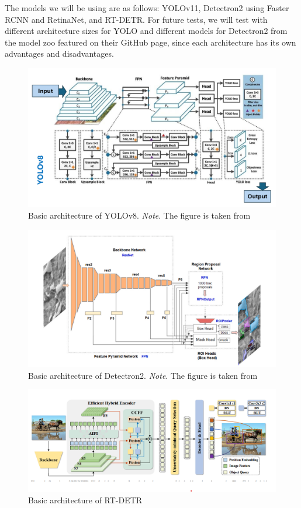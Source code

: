 \documentclass[stu,12pt,floatsintext]{apa7}
\begin{document}
The models we will be using are as follows: YOLOv11, Detectron2 using Faster RCNN and RetinaNet, and RT-DETR. For future tests, we will test with different architecture sizes for YOLO and different models for Detectron2 from the model zoo featured on their GitHub page, since each architecture has its own advantages and disadvantages.

\begin{figure}[!htb]
	\centering
	\includegraphics[width=0.75\linewidth]{images/YOLOv8_architecture.png}
	\caption{Basic architecture of YOLOv8.
		\textit{Note}. The figure is taken from \textcite{sapkota_comparing_2024}}
	\label{fig:YOLOv8-architecture}
\end{figure}

\begin{figure}[!htb]
	\centering
	\includegraphics[width=0.75\linewidth]{images/Detectron2_architecture.png}
	\caption{Basic architecture of Detectron2. \textit{Note}. The figure is taken from \textcite{ackermann_automated_2022}}
	\label{fig:Detectron2-architecture}
\end{figure}

\begin{figure}
    \centering
    \includegraphics[width=0.75\linewidth]{rt-detr_architecture.png}
    \caption{Basic architecture of RT-DETR}
    \label{fig:rt-detr}
\end{figure}
\end{document}
